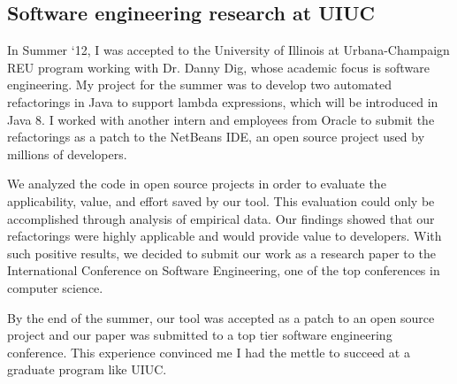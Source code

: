 \subsection{Software engineering research at UIUC}
In Summer ‘12, I was accepted to the University of Illinois at Urbana-Champaign REU program working with Dr. Danny Dig, whose academic focus is software engineering. 
My project for the summer was to develop two automated refactorings in Java to support lambda expressions, which will be introduced in Java 8. 
I worked with another intern and employees from Oracle to submit the refactorings as a patch to the NetBeans IDE, an open source project used by millions of developers. 

We analyzed the code in open source projects in order to evaluate the applicability, value, and effort saved by our tool. 
This evaluation could only be accomplished through analysis of empirical data. 
Our findings showed that our refactorings were highly applicable and would provide value to developers. 
With such positive results, we decided to submit our work as a research paper to the International Conference on Software Engineering, one of the top conferences in computer science. 

By the end of the summer, our tool was accepted as a patch to an open source project and our paper was submitted to a top tier software engineering conference. 
This experience convinced me I had the mettle to succeed at a graduate program like UIUC.